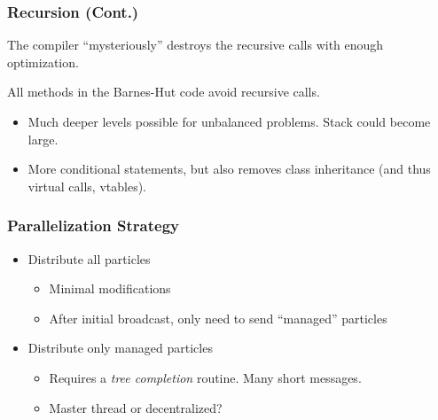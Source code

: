 \begin{frame}
	\frametitle{Recursion (Cont.)}
	The compiler ``mysteriously'' destroys the recursive calls with enough optimization.
	
	All methods in the Barnes-Hut code avoid recursive calls.
	\begin{itemize}
		\item Much deeper levels possible for unbalanced problems. Stack could become large.
		\item More conditional statements, but also removes class inheritance (and thus virtual calls, vtables).
	\end{itemize}
\end{frame}

\begin{frame}
	\frametitle{Parallelization Strategy}
	\begin{itemize}
		\item Distribute all particles
		\begin{itemize}
			\item Minimal modifications
			\item After initial broadcast, only need to send ``managed'' particles
		\end{itemize}
		\item Distribute only managed particles
		\begin{itemize}
			\item Requires a \emph{tree completion} routine. Many short messages.
			\item Master thread or decentralized?
		\end{itemize}
	\end{itemize}
\end{frame}